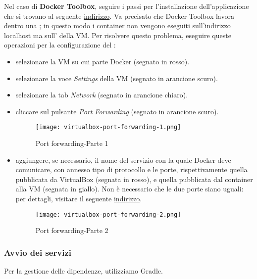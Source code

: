 \documentclass[../manuale-sviluppatore.tex]{subfiles}
\begin{document}
Nel caso di \textbf{Docker Toolbox}, seguire i passi per l'installazione dell'applicazione che si trovano al seguente \href{https://docs.docker.com/toolbox/toolbox_install_windows/}{indirizzo}.
Va precisato che Docker Toolbox lavora dentro una ; in questo modo i container non vengono eseguiti sull'indirizzo localhost ma sull' della VM\@.
Per risolvere questo problema, eseguire queste operazioni per la configurazione del :
\begin{itemize}
  \item selezionare la VM su cui parte Docker (segnato in rosso).
  \item selezionare la voce \textit{Settings} della VM (segnato in arancione scuro).
  \item selezionare la tab \textit{Network} (segnato in arancione chiaro).
  \item cliccare sul pulsante \textit{Port Forwarding} (segnato in arancione scuro).

  \begin{figure}[H]
    \centering
    \texttt{[image: virtualbox-port-forwarding-1.png]}
    \caption{Port forwarding-Parte 1}%
    \label{fig:port_forwarding_parte_1}
  \end{figure}

  \item aggiungere, se necessario, il nome del servizio con la quale Docker deve comunicare, con annesso tipo di protocollo e le porte, rispettivamente quella pubblicata da VirtualBox (segnata in rosso), e quella pubblicata dal container alla VM (segnata in giallo). Non è necessario che le due porte siano uguali: per dettagli, visitare il seguente \href{https://docs.docker.com/config/containers/container-networking/#published-ports#published-ports}{indirizzo}.

  \begin{figure}[H]
    \centering
    \texttt{[image: virtualbox-port-forwarding-2.png]}
    \caption{Port forwarding-Parte 2}%
    \label{fig:port_forwarding_parte_2}
  \end{figure}
\end{itemize}
\newpage

\subsubsection{Avvio dei servizi}%
\label{subs:avvio_dei_servizi}

Per la gestione delle dipendenze, utilizziamo Gradle.
\end{document}

